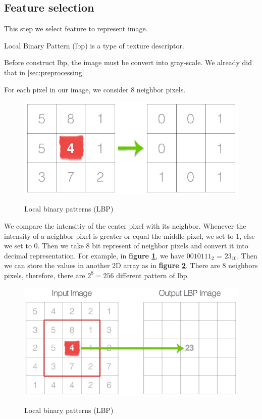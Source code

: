 \documentclass[a4paper, 12pt]{article}
\begin{document}
\subsection{Feature selection}
	This step we select feature to represent image. 
	
	Local Binary Pattern (lbp) is a type of texture descriptor\cite{pietikainen2010local}. 
	
	Before construct lbp, the image must be convert into gray-scale. We already did that in \ref{sec:preprocessing}
	
	For each pixel in our image, we consider 8 neighbor pixels.
	\begin{figure}[H]
		\centering
		\includegraphics[width=1\linewidth]{./figure/lbp_thresholding.jpg}
		\caption[]{Local binary patterns (LBP)}
		\label{fig:lbp}
		\cite{lbptutorial}
	\end{figure}
	We compare the intensitiy of the center pixel with its neighbor. Whenever the intensity of a neighbor pixel is greater or equal the middle pixel, we set to 1, else we set to 0. Then we take 8 bit represent of neighbor pixels and convert it into decimal representation. For example, in \textbf{figure \ref{fig:lbp}}, we have $0010111_2$ = $23_10$. Then we can store the values in another 2D array as in \textbf{figure \ref{fig:lbp_to_output}}. There are 8 neighbors pixels, therefore, there are $2^8 = 256$ different pattern of lbp. 
	
	\begin{figure}[H]
		\centering
		\includegraphics[width=1\linewidth]{./figure/lbp_to_output.jpg}
		\caption[]{Local binary patterns (LBP)}
		\label{fig:lbp_to_output}
		\cite{lbptutorial}
	\end{figure}
	
\end{document}
